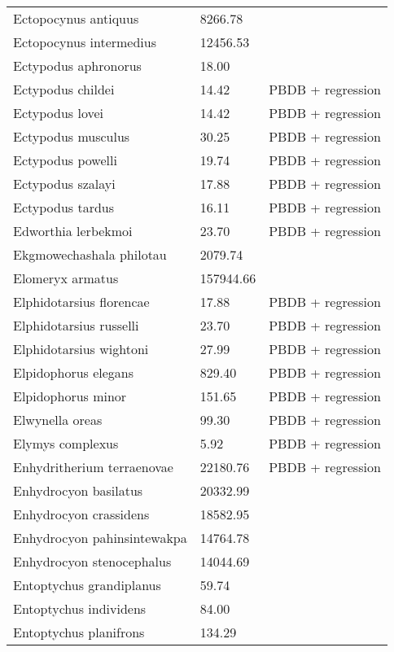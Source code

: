 \documentclass{article}
\begin{document}
\begin{center}
\begin{longtable}{p{} p{} p{} }
  Ectopocynus antiquus & 8266.78 & \cite{Tomiya2013} \\ 
  Ectopocynus intermedius & 12456.53 & \cite{Tomiya2013} \\ 
  Ectypodus aphronorus & 18.00 & \cite{Wilson2012} \\ 
  Ectypodus childei & 14.42 & PBDB + regression \\ 
  Ectypodus lovei & 14.42 & PBDB + regression \\ 
  Ectypodus musculus & 30.25 & PBDB + regression \\ 
  Ectypodus powelli & 19.74 & PBDB + regression \\ 
  Ectypodus szalayi & 17.88 & PBDB + regression \\ 
  Ectypodus tardus & 16.11 & PBDB + regression \\ 
  Edworthia lerbekmoi & 23.70 & PBDB + regression \\ 
  Ekgmowechashala philotau & 2079.74 & \cite{Tomiya2013} \\ 
  Elomeryx armatus & 157944.66 & \cite{Tomiya2013} \\ 
  Elphidotarsius florencae & 17.88 & PBDB + regression \\ 
  Elphidotarsius russelli & 23.70 & PBDB + regression \\ 
  Elphidotarsius wightoni & 27.99 & PBDB + regression \\ 
  Elpidophorus elegans & 829.40 & PBDB + regression \\ 
  Elpidophorus minor & 151.65 & PBDB + regression \\ 
  Elwynella oreas & 99.30 & PBDB + regression \\ 
  Elymys complexus & 5.92 & PBDB + regression \\ 
  Enhydritherium terraenovae & 22180.76 & PBDB + regression \\ 
  Enhydrocyon basilatus & 20332.99 & \cite{Tomiya2013} \\ 
  Enhydrocyon crassidens & 18582.95 & \cite{Tomiya2013} \\ 
  Enhydrocyon pahinsintewakpa & 14764.78 & \cite{Tomiya2013} \\ 
  Enhydrocyon stenocephalus & 14044.69 & \cite{Tomiya2013} \\ 
  Entoptychus grandiplanus & 59.74 & \cite{Tomiya2013} \\ 
  Entoptychus individens & 84.00 & \cite{McKenna2011} \\ 
  Entoptychus planifrons & 134.29 & \cite{Tomiya2013} \\ 

\end{longtable}
\end{center}
\end{document}
